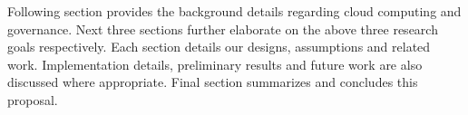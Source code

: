 Following section provides the background details regarding cloud computing and governance.
Next three sections further elaborate on the above three research goals respectively. 
Each section details our designs, assumptions and related work. Implementation details,
preliminary results and future work are also discussed where appropriate. Final section
summarizes and concludes this proposal.

